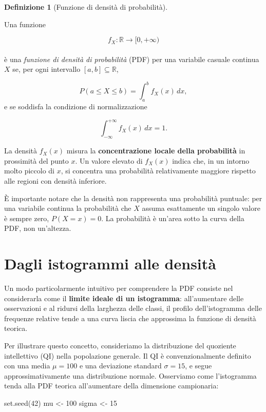 \documentclass[
  italian,
  letterpaper,
  a4paper,
  11pt,
  open=any]{scrbook}
\newenvironment{Shaded}{\begin{snugshade}}{\end{snugshade}}
\newcommand{\DecValTok}[1]{\textcolor[rgb]{0.68,0.00,0.00}{#1}}
\newcommand{\FunctionTok}[1]{\textcolor[rgb]{0.28,0.35,0.67}{#1}}
\newcommand{\NormalTok}[1]{\textcolor[rgb]{0.00,0.23,0.31}{#1}}
\newcommand{\OtherTok}[1]{\textcolor[rgb]{0.00,0.23,0.31}{#1}}
\theoremstyle{plain}
\theoremstyle{definition}
\theoremstyle{definition}
\newtheorem{definition}{Definizione}[chapter]
\theoremstyle{remark}
\begin{document}
\begin{definition}[Funzione di densità di
probabilità]\protect\hypertarget{def-pdf}{}\label{def-pdf}

Una funzione

\[
f_X : \mathbb{R} \to [0, +\infty)
\]\\
è una \emph{funzione di densità di probabilità} (PDF) per una variabile
casuale continua \(X\) se, per ogni intervallo
\([a,b] \subseteq \mathbb{R}\),

\[
P(a \leq X \leq b) = \int_a^b f_X(x)\,dx,
\] e se soddisfa la condizione di normalizzazione

\[
\int_{-\infty}^{+\infty} f_X(x)\,dx = 1.
\]

La densità \(f_X(x)\) misura la \textbf{concentrazione locale della
probabilità} in prossimità del punto \(x\). Un valore elevato di
\(f_X(x)\) indica che, in un intorno molto piccolo di \(x\), si
concentra una probabilità relativamente maggiore rispetto alle regioni
con densità inferiore.

È importante notare che la densità non rappresenta una probabilità
puntuale: per una variabile continua la probabilità che \(X\) assuma
esattamente un singolo valore è sempre zero, \(P(X = x) = 0\). La
probabilità è un'area sotto la curva della PDF, non un'altezza.

\section{Dagli istogrammi alle
densità}\label{dagli-istogrammi-alle-densituxe0}

Un modo particolarmente intuitivo per comprendere la PDF consiste nel
considerarla come il \textbf{limite ideale di un istogramma}:
all'aumentare delle osservazioni e al ridursi della larghezza delle
classi, il profilo dell'istogramma delle frequenze relative tende a una
curva liscia che approssima la funzione di densità teorica.

Per illustrare questo concetto, consideriamo la distribuzione del
quoziente intellettivo (QI) nella popolazione generale. Il QI è
convenzionalmente definito con una media \(\mu = 100\) e una deviazione
standard \(\sigma = 15\), e segue approssimativamente una distribuzione
normale. Osserviamo come l'istogramma tenda alla PDF teorica
all'aumentare della dimensione campionaria:

\begin{Shaded}
\begin{Highlighting}[]
\FunctionTok{set.seed}\NormalTok{(}\DecValTok{42}\NormalTok{)}
\NormalTok{mu }\OtherTok{\textless{}{-}} \DecValTok{100}
\NormalTok{sigma }\OtherTok{\textless{}{-}} \DecValTok{15}


\end{Highlighting}
\end{Shaded}
\end{definition}
\end{document}
